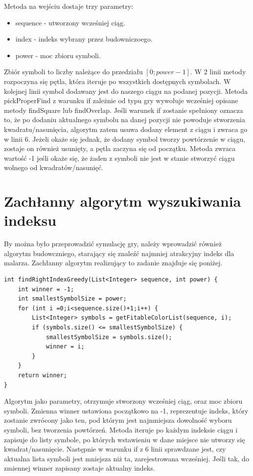 \documentclass[document]{xmgr}
\begin{document}
Metoda na wejściu dostaje trzy parametry:
\begin{itemize}
\item sequence - utworzony wcześniej ciąg.
\item index - indeks wybrany przez budowniczoego.
\item power - moc zbioru symboli.
\end{itemize}
Zbiór symboli to liczby należące do przedziału $[0; power-1]$. W 2 linii metody rozpoczyna się pętla, która iteruje po wszystkich dostępnych symbolach. W kolejnej linii symbol dodawany jest do naszego ciągu na podanej pozycji. Metoda pickProperFind z warunku if zależnie od typu gry wywołuje wcześniej opisane metody findSquare lub findOverlap. Jeśli warunek if zostanie spełniony oznacza to, że po dodaniu aktualnego symbolu na danej pozycji nie powoduje stworzenia kwadratu/nasunięcia, algorytm zatem usuwa dodany element z ciągu i zwraca go w linii 6. Jeżeli  okaże się jednak, że dodany symbol tworzy powtórzenie w ciągu, zostaje on również usunięty, a pętla zaczyna się od początku. Metoda zwraca wartość -1 jeśli okaże się, że żaden z symboli nie jest w stanie stworzyć ciągu wolnego od kwadratów/nasunięć.

\section{Zachłanny algorytm wyszukiwania indeksu}
By można było przeprowadzić symulację gry, należy wprowadzić również algorytm budowczniego, starający się znaleźć najmniej atrakcyjny indeks dla malarza. Zachłanny algorytm realizujący to zadanie znajduje się poniżej.

\begin{lstlisting}[frame=single]
int findRightIndexGreedy(List<Integer> sequence, int power) {
	int winner = -1;
	int smallestSymbolSize = power;
	for (int i =0;i<sequence.size()+1;i++) {
		List<Integer> symbols = getFitableColorList(sequence, i);
		if (symbols.size() <= smallestSymbolSize) {
			smallestSymbolSize = symbols.size();
			winner = i;
		}
	}
	return winner;
}
\end{lstlisting}

Algorytm jako parametry, otrzymuje stworzony wcześniej ciąg, oraz moc zbioru symboli. Zmienna winner ustawiona początkowo na -1, reprezentuje indeks, który zostanie zwrócony jako ten, pod którym jest najmniejsza dowolność wyboru symboli, bez tworzenia powtórzeń. Metoda iteruje po każdym indeksie ciągu i zapisuje do listy symbole, po których wstawieniu w dane miejsce nie utworzy się kwadrat/nasunięcie. Następnie w warunku if z 6 linii sprawdzane jest, czy aktualna lista symboli jest mniejsza niż ta, zarejestrowana wcześniej. Jeśli tak, do zmiennej winner zapisany zostaje aktualny indeks.
\end{document}
